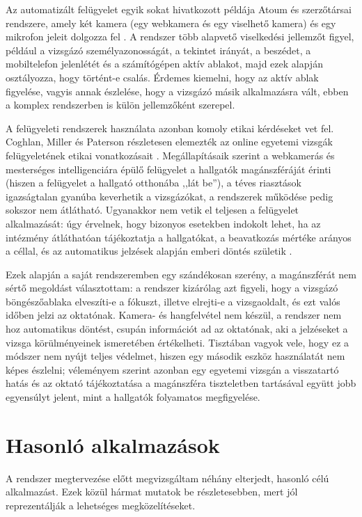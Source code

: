 Az automatizált felügyelet egyik sokat hivatkozott példája Atoum és szerzőtársai rendszere,
amely két kamera (egy webkamera és egy viselhető kamera) és egy mikrofon jeleit dolgozza fel
\cite{atoum2017automated}. A rendszer több alapvető viselkedési jellemzőt figyel, például a
vizsgázó személyazonosságát, a tekintet irányát, a beszédet, a mobiltelefon jelenlétét és a
számítógépen aktív ablakot, majd ezek alapján osztályozza, hogy történt-e csalás. Érdemes
kiemelni, hogy az aktív ablak figyelése, vagyis annak észlelése, hogy a vizsgázó másik
alkalmazásra vált, ebben a komplex rendszerben is külön jellemzőként szerepel.

A felügyeleti rendszerek használata azonban komoly etikai kérdéseket vet fel. Coghlan, Miller és
Paterson részletesen elemezték az online egyetemi vizsgák felügyeletének etikai vonatkozásait
\cite{coghlan2021proctor}. Megállapításaik szerint a webkamerás és mesterséges intelligenciára épülő
felügyelet a hallgatók magánszféráját érinti (hiszen a felügyelet a hallgató otthonába ,,lát
be''), a téves riasztások igazságtalan gyanúba keverhetik a vizsgázókat, a rendszerek működése
pedig sokszor nem átlátható. Ugyanakkor nem vetik el teljesen a felügyelet alkalmazását: úgy
érvelnek, hogy bizonyos esetekben indokolt lehet, ha az intézmény átláthatóan tájékoztatja a
hallgatókat, a beavatkozás mértéke arányos a céllal, és az automatikus jelzések alapján
emberi döntés születik \cite{coghlan2021proctor}.

Ezek alapján a saját rendszeremben egy szándékosan szerény, a magánszférát nem sértő megoldást
választottam: a rendszer kizárólag azt figyeli, hogy a vizsgázó böngészőablaka elveszíti-e a
fókuszt, illetve elrejti-e a vizsgaoldalt, és ezt valós időben jelzi az oktatónak. Kamera- és
hangfelvétel nem készül, a rendszer nem hoz automatikus döntést, csupán információt ad az
oktatónak, aki a jelzéseket a vizsga körülményeinek ismeretében értékelheti. Tisztában vagyok vele,
hogy ez a módszer nem nyújt teljes védelmet, hiszen egy második eszköz használatát nem képes
észlelni; véleményem szerint azonban egy egyetemi vizsgán a visszatartó hatás és az oktató
tájékoztatása a magánszféra tiszteletben tartásával együtt jobb egyensúlyt jelent, mint a
hallgatók folyamatos megfigyelése.

\section{Hasonló alkalmazások}
\label{sec:hasonlo}

A rendszer megtervezése előtt megvizsgáltam néhány elterjedt, hasonló célú alkalmazást. Ezek közül
hármat mutatok be részletesebben, mert jól reprezentálják a lehetséges megközelítéseket.

